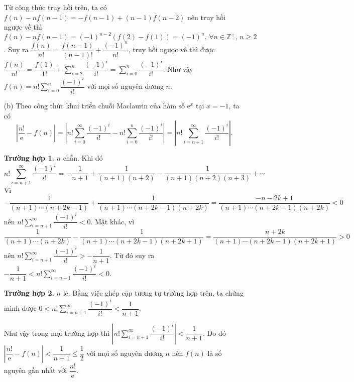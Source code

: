 \begin{enumerate}
{        Từ công thức truy hồi trên, ta có $f(n) - nf(n-1) = -f(n-1) + (n-1)f(n-2)$ nên truy hồi ngược về thì $f(n) - nf(n-1) = (-1)^{n-2}\left(f(2) - f(1)\right) = (-1)^n,\,\forall n\in \mathbb{Z^+},\,n\geq 2$. Suy ra $\dfrac{f(n)}{n!} = \dfrac{f(n-1)}{(n-1)!} + \dfrac{(-1)^n}{n!}$, truy hồi ngược về thì được $\displaystyle\dfrac{f(n)}{n!} = \dfrac{f(1)}{1!} + \sum\limits_{i=2}^n \dfrac{(-1)^i}{i!} = \sum\limits_{i=0}^n \dfrac{(-1)^i}{i!}$. Như vậy $\displaystyle f(n) = n! \sum\limits_{i=0}^n \dfrac{(-1)^i}{i!}$ với mọi số nguyên dương $n$.
    }
    \item[(b)] Theo công thức khai triển chuỗi Maclaurin của hàm số $\mathrm{e}^x$ tại $x=-1$, ta có $$\left|\dfrac{n!}{\mathrm{e}} - f(n)\right| = \left|n! \sum\limits_{i=0}^\infty \dfrac{(-1)^i}{i!} - n! \sum\limits_{i=0}^n \dfrac{(-1)^i}{i!}\right| = \left|n!\sum\limits_{i=n+1}^\infty \dfrac{(-1)^i}{i!}\right|.$$
    
    \textbf{Trường hợp 1. }$n$ chẵn. Khi đó $$n!\sum\limits_{i=n+1}^\infty \dfrac{(-1)^i}{i!} = -\dfrac{1}{n+1} +\dfrac{1}{(n+1)(n+2)} -\dfrac{1}{(n+1)(n+2)(n+3)} +\cdots$$ Vì $-\dfrac{1}{(n+1)\cdots(n+2k-1)}+\dfrac{1}{(n+1)\cdots(n+2k-1)(n+2k)} = \dfrac{-n-2k+1}{(n+1)\cdots(n+2k-1)(n+2k)} < 0$ nên $\displaystyle n!\sum\limits_{i=n+1}^\infty \dfrac{(-1)^i}{i!} < 0$. Mặt khác, vì $\dfrac{1}{(n+1)\cdots(n+2k)}-\dfrac{1}{(n+1)\cdots(n+2k-1)(n+2k+1)} = \dfrac{n+2k}{(n+1)\cdots(n+2k-1)(n+2k+1)} > 0$ nên $\displaystyle n!\sum\limits_{i=n+1}^\infty \dfrac{(-1)^i}{i!} > -\dfrac{1}{n+1}$. Từ đó suy ra $-\dfrac{1}{n+1} < \displaystyle n!\sum\limits_{i=n+1}^\infty \dfrac{(-1)^i}{i!} < 0$.

    \textbf{Trường hợp 2. }$n$ lẻ. Bằng việc ghép cặp tương tự trường hợp trên, ta chứng minh được $0 < \displaystyle n!\sum\limits_{i=n+1}^\infty \dfrac{(-1)^i}{i!} < \dfrac{1}{n+1}$.

    Như vậy trong mọi trường hợp thì $\displaystyle \left|n!\sum\limits_{i=n+1}^\infty \dfrac{(-1)^i}{i!}\right| < \dfrac{1}{n+1}$. Do đó $\left|\dfrac{n!}{\mathrm{e}} - f(n)\right| < \dfrac{1}{n+1} \leq \dfrac{1}{2}$ với mọi số nguyên dương $n$ nên $f(n)$ là số nguyên gần nhất với $\dfrac{n!}{\mathrm{e}}$.
\end{enumerate}

